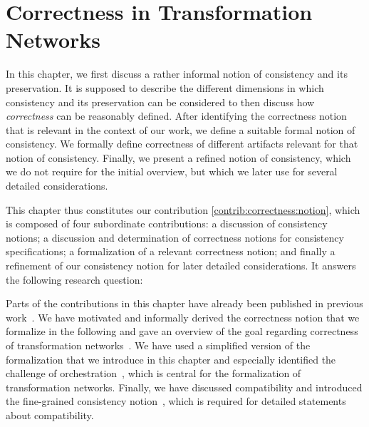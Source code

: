 \chapter{Correctness in Transformation Networks
}
\label{chap:correctness}


In this chapter, we first discuss a rather informal notion of consistency and its preservation. It is supposed to describe the different dimensions in which consistency and its preservation can be considered to then discuss how \emph{correctness} can be reasonably defined.
After identifying the correctness notion that is relevant in the context of our work, we define a suitable formal notion of consistency.
We formally define correctness of different artifacts relevant for that notion of consistency.
Finally, we present a refined notion of consistency, which we do not require for the initial overview, but which we later use for several detailed considerations.

This chapter thus constitutes our contribution \autoref{contrib:correctness:notion}, which is composed of four subordinate contributions: a discussion of consistency notions; a discussion and determination of correctness notions for consistency specifications; a formalization of a relevant correctness notion; and finally a refinement of our consistency notion for later detailed considerations.
It answers the following research question:


Parts of the contributions in this chapter have already been published in previous work~.
We have motivated and informally derived the correctness notion that we formalize in the following and gave an overview of the goal regarding correctness of transformation networks~.
We have used a simplified version of the formalization that we introduce in this chapter and especially identified the challenge of orchestration~, which is central for the formalization of transformation networks.
Finally, we have discussed compatibility and introduced the fine-grained consistency notion~, which is required for detailed statements about compatibility.






